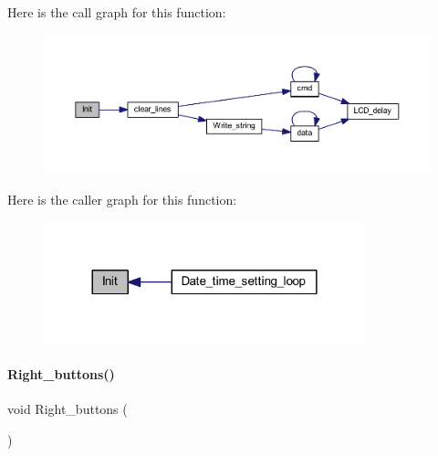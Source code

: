 Here is the call graph for this function\+:
\nopagebreak
\begin{figure}[H]
\begin{center}
\leavevmode
\includegraphics[width=350pt]{a00026_a1e3b6d38df0786ccf7f938d60e386aae_cgraph}
\end{center}
\end{figure}
Here is the caller graph for this function\+:
\nopagebreak
\begin{figure}[H]
\begin{center}
\leavevmode
\includegraphics[width=264pt]{a00026_a1e3b6d38df0786ccf7f938d60e386aae_icgraph}
\end{center}
\end{figure}
\mbox{\label{a00026_a5c01f8b6feb96baa4580a82f5c32c16e}} 
\paragraph{Right\+\_\+buttons()}
{\footnotesize\ttfamily void Right\+\_\+buttons (\begin{DoxyParamCaption}{ }\end{DoxyParamCaption})}

